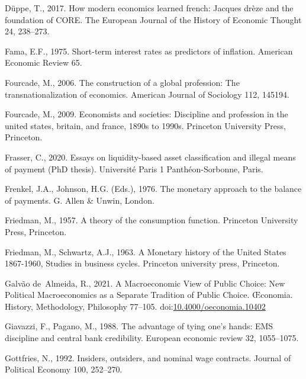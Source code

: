 \documentclass[
  12pt,
  onecolumn]{article}
\newlength{\cslhangindent}
\newlength{\cslentryspacingunit} %
\newenvironment{CSLReferences}[2] %
 {%
  \setlength{\parindent}{0pt}
  \ifodd #1
  \let\oldpar\par
  \def\par{\hangindent=\cslhangindent\oldpar}
  \fi
  \setlength{\parskip}{#2\cslentryspacingunit}
 }%
 {}
\begin{document}
\begin{CSLReferences}{1}{0}
\leavevmode{}%
Düppe, T., 2017. How modern economics learned french: Jacques drèze and
the foundation of CORE. The European Journal of the History of Economic
Thought 24, 238--273.

\leavevmode{}%
Fama, E.F., 1975. Short-term interest rates as predictors of inflation.
American Economic Review 65.

\leavevmode{}%
Fourcade, M., 2006. The construction of a global profession: The
transnationalization of economics. American Journal of Sociology 112,
145194.

\leavevmode{}%
Fourcade, M., 2009. Economists and societies: Discipline and profession
in the united states, britain, and france, 1890s to 1990s. Princeton
University Press, Princeton.

\leavevmode{}%
Frasser, C., 2020. Essays on liquidity-based asset classiﬁcation and
illegal means of payment (PhD thesis). Université Paris 1
Panthéon-Sorbonne, Paris.

\leavevmode{}%
Frenkel, J.A., Johnson, H.G. (Eds.), 1976. The monetary approach to the
balance of payments. {G. Allen \& Unwin}, {London}.

\leavevmode{}%
Friedman, M., 1957. A theory of the consumption function. Princeton
University Press, Princeton.

\leavevmode{}%
Friedman, M., Schwartz, A.J., 1963. A {Monetary} history of the {United}
{States} 1867-1960, Studies in business cycles. Princeton university
press, Princeton.

\leavevmode{}%
Galvão de~Almeida, R., 2021. A {Macroeconomic View} of {Public Choice}:
{New Political Macroeconomics} as a {Separate Tradition} of {Public
Choice}. Œconomia. History, Methodology, Philosophy 77--105.
doi:\href{https://doi.org/10.4000/oeconomia.10402}{10.4000/oeconomia.10402}

\leavevmode{}%
Giavazzi, F., Pagano, M., 1988. The advantage of tying one's hands:
{EMS} discipline and central bank credibility. European economic review
32, 1055--1075.

\leavevmode{}%
Gottfries, N., 1992. Insiders, outsiders, and nominal wage contracts.
Journal of Political Economy 100, 252--270.


\end{CSLReferences}
\end{document}
